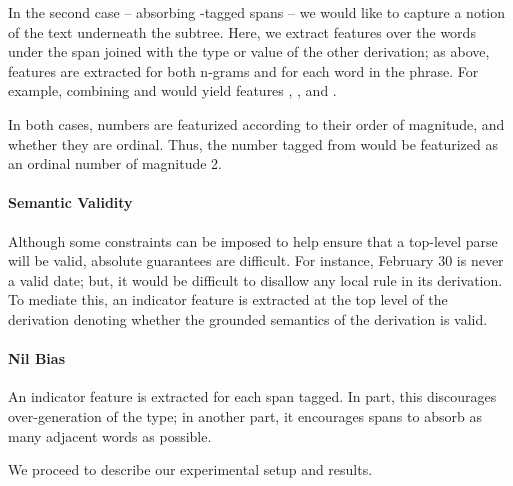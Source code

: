 In the second case -- absorbing -tagged spans -- 
  we would like to capture a notion of the text underneath
  the subtree.
Here, we extract features over the words under the  span joined with
  the type or value of the other derivation;
  as above, features are extracted for both n-grams and for each word in
  the phrase.
For example, combining  and  would yield features
  ,
  , and
  .

In both cases, numbers are featurized according to their order of magnitude,
  and whether they are ordinal.
Thus, the number tagged from  would be featurized as an
  ordinal number of magnitude 2.

\paragraph{Semantic Validity}
Although some constraints can be imposed to help ensure that a top-level parse
  will be valid, absolute guarantees are difficult.
For instance, February 30 is never a valid date; but, it would be difficult
  to disallow any local rule in its derivation.
To mediate this, an indicator feature is extracted at the top level of the
  derivation denoting whether the grounded semantics of the derivation is
  valid.

\paragraph{Nil Bias}
An indicator feature is extracted for each  span tagged.
In part, this discourages over-generation of the type; in another part,
  it encourages  spans to absorb as many adjacent words as possible.


We proceed to describe our experimental setup and results.
